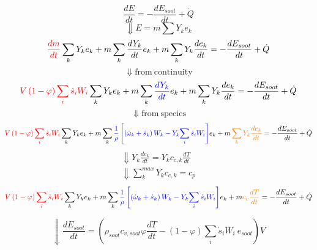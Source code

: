 \begin{equation*}
	\frac{dE}{dt}=-\frac{dE_{soot}}{dt}+\dot{Q}
\end{equation*}
\begin{equation*}
	\Downarrow E=m\sum{Y_ke_k}
\end{equation*}
\begin{equation*}
	\color{red}
	\frac{dm}{dt}
	\color{black}
	\sum_{k}{Y_ke_k}+m\sum_{k}{\frac{dY_k}{dt}e_k}+m\sum_{k}{Y_k\frac{de_k}{dt}}
	=
	-\frac{dE_{soot}}{dt}+\dot{Q}
\end{equation*}
\begin{equation*}
	\Downarrow \mathrm{from\: continuity}
\end{equation*}
\begin{equation*}
	\color{red}
	V\left(1-\varphi\right)\sum_{i}{{\dot{s}}_iW_i}
	\color{black}
	\sum_{k}{Y_ke_k}
	+
	m
	\sum_{k}\color{blue}{\frac{dY_k}{dt}}
	\color{black}
	e_k
	+
	m\sum_{k}{Y_k\frac{de_k}{dt}}
	=
	-\frac{dE_{soot}}{dt}+\dot{Q}
\end{equation*}
\begin{equation*}
	\Downarrow \mathrm{from\: species}
\end{equation*}
\begin{equation*}
	\color{red}
	V\left(1-\varphi\right)\sum_{i}{{\dot{s}}_iW_i}
	\color{black}
	\sum_{k}{Y_ke_k}
	+
	m
	\sum_{k}\color{blue}
	{
		\frac{1}{\rho}
		\left[
		\left({\dot{\omega}}_k+{\dot{s}}_k\right)W_k
		-Y_k{\sum_{i}{{\dot{s}}_iW_i}}
		\right]
	}
	\color{black}
	e_k
	+
	m	
	\color{orange}\sum_{k}{
	Y_k
	\frac{de_k}{dt}}
	\color{black}
	=
	-\frac{dE_{soot}}{dt}+\dot{Q}
\end{equation*}
\begin{equation*}
	\begin{split}
	\Downarrow
	Y_k\frac{de_k}{dt} = Y_k c_{c,k}\frac{dT}{dt} \\
	\Downarrow
	\sum_{k}^{max} Y_k c_{c,k} = c_p
	\end{split}
\end{equation*}
\begin{equation*}
	\color{red}
	V\left(1-\varphi\right)\sum_{i}{{\dot{s}}_iW_i}
	\color{black}
	\sum_{k}{Y_ke_k}
	+
	m
	\sum_{k}\color{blue}
	{
		\frac{1}{\rho}
		\left[
		\left({\dot{\omega}}_k+{\dot{s}}_k\right)W_k
		-Y_k{\sum_{i}{{\dot{s}}_iW_i}}
		\right]
	}
	\color{black}
	e_k
	+
	m	
	\color{orange}
		c_v
		\frac{dT}{dt}
	\color{black}
	=
	-\frac{dE_{soot}}{dt}+\dot{Q}
\end{equation*}

\begin{equation*}
	\Downarrow 
	\frac{dE_{soot}}{dt}= \left(\rho_{soot}c_{v,soot}\varphi\frac{dT}{dt}-\left(1-\varphi\right)\sum_{i}{{\dot{s}}_iW_i}\ e_{soot}\right)V
\end{equation*}

